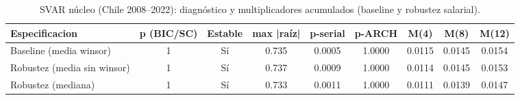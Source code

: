 \begin{table}[htbp]
\centering
\caption{SVAR núcleo (Chile 2008--2022): diagnóstico y multiplicadores acumulados (baseline y robustez salarial).}
\label{tab:svar_core_summary}
\footnotesize
\begin{tabular}{lcccccccc}
\toprule
Especificacion & p (BIC/SC) & Estable & max |raíz| & p-serial & p-ARCH & M(4) & M(8) & M(12) \\
\midrule
Baseline (media winsor) & 1 & Sí & 0.735 & 0.0005 & 1.0000 & 0.0115 & 0.0145 & 0.0154 \\
Robustez (media sin winsor) & 1 & Sí & 0.737 & 0.0009 & 1.0000 & 0.0114 & 0.0145 & 0.0153 \\
Robustez (mediana) & 1 & Sí & 0.733 & 0.0011 & 1.0000 & 0.0111 & 0.0139 & 0.0147 \\
\bottomrule
\end{tabular}
\end{table}

